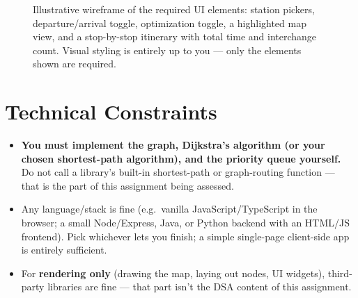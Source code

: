 \documentclass[11pt,a4paper]{article}
\begin{document}
\begin{figure}[h]
\caption{Illustrative wireframe of the required UI elements: station
pickers, departure/arrival toggle, optimization toggle, a highlighted map
view, and a stop-by-stop itinerary with total time and interchange count.
Visual styling is entirely up to you --- only the elements shown are
required.}
\label{fig:ui}
\end{figure}

\section{Technical Constraints}
\label{sec:constraints}
\begin{itemize}
  \item \textbf{You must implement the graph, Dijkstra's algorithm (or
        your chosen shortest-path algorithm), and the priority queue
        yourself.} Do not call a library's built-in shortest-path or
        graph-routing function --- that is the part of this assignment
        being assessed.
  \item Any language/stack is fine (e.g.\ vanilla JavaScript/TypeScript in
        the browser; a small Node/Express, Java, or Python backend with an
        HTML/JS frontend). Pick whichever lets you finish; a simple
        single-page client-side app is entirely sufficient.
  \item For \textbf{rendering only} (drawing the map, laying out nodes, UI
        widgets), third-party libraries are fine --- that part isn't the
        DSA content of this assignment.
\end{itemize}

\end{document}
